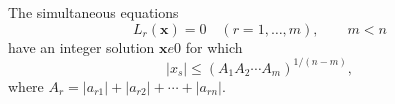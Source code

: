 \begin{proposition}\label{eq:003}
    The simultaneous equations
\[
    L_r(\mathbf{x})=0\quad(r=1,\ldots,m),\qquad m<n
\]
    have an integer solution $\mathbf{x}
    e0$ for which
\[
    |x_s|\le (A_1A_2\cdots A_m)^{1/(n-m)},
\]
    where $A_r=|a_{r1}|+|a_{r2}|+\cdots+|a_{rn}|$.
\end{proposition}

